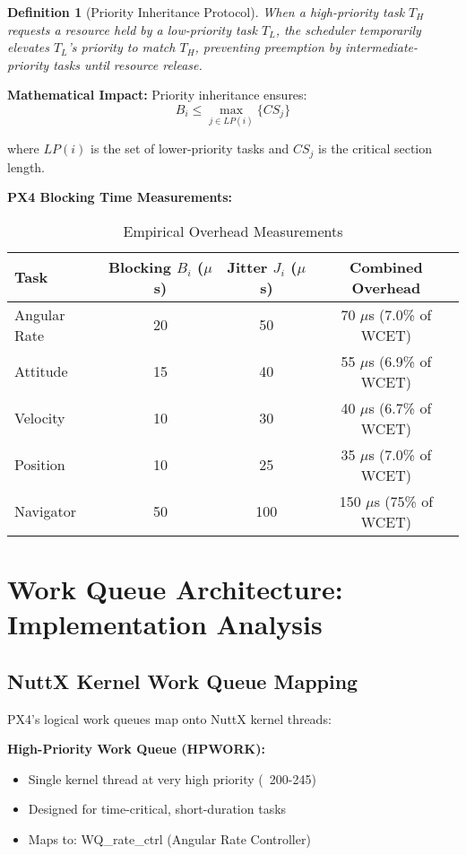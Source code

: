 \documentclass[12pt,a4paper]{article}
\newtheorem{definition}{Definition}
\begin{document}
\begin{definition}[Priority Inheritance Protocol]
When a high-priority task $T_H$ requests a resource held by a low-priority task $T_L$, the scheduler temporarily elevates $T_L$'s priority to match $T_H$, preventing preemption by intermediate-priority tasks until resource release.
\end{definition}

\textbf{Mathematical Impact:} Priority inheritance ensures:
\begin{equation}
B_i \leq \max_{j \in LP(i)} \{CS_j\}
\end{equation}

where $LP(i)$ is the set of lower-priority tasks and $CS_j$ is the critical section length.

\textbf{PX4 Blocking Time Measurements:}
\begin{table}[H]
\centering
\begin{tabular}{|l|c|c|c|}
\hline
\textbf{Task} & \textbf{Blocking $B_i$ ($\mu$s)} & \textbf{Jitter $J_i$ ($\mu$s)} & \textbf{Combined Overhead} \\
\hline
Angular Rate & 20 & 50 & 70 $\mu$s (7.0\% of WCET) \\
Attitude & 15 & 40 & 55 $\mu$s (6.9\% of WCET) \\
Velocity & 10 & 30 & 40 $\mu$s (6.7\% of WCET) \\
Position & 10 & 25 & 35 $\mu$s (7.0\% of WCET) \\
Navigator & 50 & 100 & 150 $\mu$s (75\% of WCET) \\
\hline
\end{tabular}
\caption{Empirical Overhead Measurements}
\end{table}

\section{Work Queue Architecture: Implementation Analysis}

\subsection{NuttX Kernel Work Queue Mapping}

PX4's logical work queues map onto NuttX kernel threads:

\textbf{High-Priority Work Queue (HPWORK):}
\begin{itemize}
\item Single kernel thread at very high priority (~200-245)
\item Designed for time-critical, short-duration tasks
\item Maps to: WQ\_rate\_ctrl (Angular Rate Controller)
\end{itemize}
\end{document}
